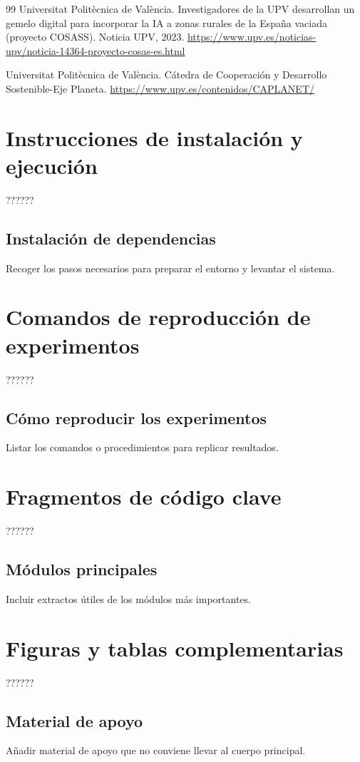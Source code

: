 \documentclass[11pt,spanish,listoffigures,listoftables]{tfgetsinf}
\begin{document}
\begin{thebibliography}{99}
Universitat Politècnica de València.
\newblock Investigadores de la UPV desarrollan un gemelo digital para incorporar la IA a zonas rurales de la España vaciada (proyecto COSASS).
\newblock Noticia UPV, 2023.
\newblock \url{https://www.upv.es/noticias-upv/noticia-14364-proyecto-cosas-es.html}

Universitat Politècnica de València.
\newblock Cátedra de Cooperación y Desarrollo Sostenible-Eje Planeta.
\newblock \url{https://www.upv.es/contenidos/CAPLANET/}

\end{thebibliography}
\cleardoublepage


\APPENDIX

\chapter{Instrucciones de instalación y ejecución}
??????
\section{Instalación de dependencias}
Recoger los pasos necesarios para preparar el entorno y levantar el sistema.

\chapter{Comandos de reproducción de experimentos}
??????
\section{Cómo reproducir los experimentos}
Listar los comandos o procedimientos para replicar resultados.

\chapter{Fragmentos de código clave}
??????
\section{Módulos principales}
Incluir extractos útiles de los módulos más importantes.

\chapter{Figuras y tablas complementarias}
??????
\section{Material de apoyo}
Añadir material de apoyo que no conviene llevar al cuerpo principal.
\end{document}
